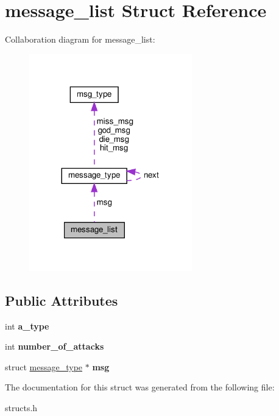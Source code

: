 \hypertarget{structmessage__list}{}\section{message\+\_\+list Struct Reference}
\label{structmessage__list}


Collaboration diagram for message\+\_\+list\+:
\nopagebreak
\begin{figure}[H]
\begin{center}
\leavevmode
\includegraphics[width=200pt]{structmessage__list__coll__graph}
\end{center}
\end{figure}
\subsection*{Public Attributes}
\begin{DoxyCompactItemize}
\item 
\mbox{\label{structmessage__list_a74fceaced03e336bdf83ca08d63515ab}} 
int {\bfseries a\+\_\+type}
\item 
\mbox{\label{structmessage__list_a2484b3f342cb61930c1c7dd58b13af39}} 
int {\bfseries number\+\_\+of\+\_\+attacks}
\item 
\mbox{\label{structmessage__list_aa9f384ba025827ef0a3ec15d6b78a478}} 
struct \hyperlink{structmessage__type}{message\+\_\+type} $\ast$ {\bfseries msg}
\end{DoxyCompactItemize}


The documentation for this struct was generated from the following file\+:\begin{DoxyCompactItemize}
\item 
structs.\+h\end{DoxyCompactItemize}
